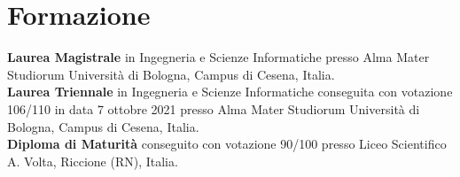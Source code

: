 \documentclass[curriculum-vitae-ita]{subfiles}
\begin{document}
	\section*{Formazione}
		 \textbf{Laurea Magistrale} in Ingegneria e Scienze Informatiche presso Alma Mater Studiorum Università di Bologna, Campus di Cesena, Italia.\\
		
		 \textbf{Laurea Triennale} in Ingegneria e Scienze Informatiche conseguita con votazione 106/110 in data 7 ottobre 2021 presso Alma Mater Studiorum Università di Bologna, Campus di Cesena, Italia.\\

		 \textbf{Diploma di Maturità} conseguito con votazione 90/100 presso Liceo Scientifico A. Volta, Riccione (RN), Italia.
		
		\iffalse
		\subsection*{Esami sostenuti durante il corso di laurea triennale}
			\begin{minipage}[t]{.47\textwidth}
				\exam{Algebra e Geometria}{26}
				\exam{Algoritmi e Strutture Dati}{31}
				\exam{Analisi Matematica}{27}
				\exam{Architetture degli Elaboratori}{29}
				\exam{Basi di Dati}{30}
				\exam{Computer Graphics}{28}
				\exam{Crittografia}{30}
				\exam{Fisica}{31}
				\exam{High-Performance Computing}{30}
				\exam{Ingegneria del software}{23}
				\exam{Matematica Discreta e Probabilità}{25}
			\end{minipage}
			\hfill
			\begin{minipage}[t]{.47\textwidth}
				\exam{Metodi Numerici}{22}
				\exam{Programmazione}{28}
				\exam{Programmazione ad Oggetti}{28}
				\exam{Programmazione di Applicazioni\\Data-Intensive}{27}
				\exam{Programmazione di Reti}{28}
				\exam{Reti di telecomunicazione}{23}
				\exam{Ricerca operativa}{26}
				\exam{Sistemi Operativi}{24}
				\exam{Tecnologie web}{24}
			\end{minipage}
		\fi
		
\end{document}
